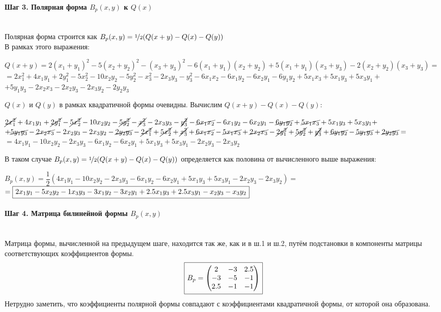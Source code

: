 \documentclass{article}
\newcommand*\squared[1]{\tikz[baseline=(char.base)]{
            \node[shape=rectangle,draw,inner sep=4pt] (char) {#1};}}
\begin{document}
\paragraph*{Шаг 3. Полярная форма $B_p(x,y)$ к $Q(x)$} \, \\
Полярная форма строится как $B_p(x,y) = \nicefrac{1}{2}(Q(x+y) - Q(x)-Q(y))$ \\
В рамках этого выражения:
\begin{center}
$Q(x+y) = 2(x_1 + y_1)^2 - 5(x_2 + y_2)^2 - (x_3 + y_3)^2 - 6(x_1 + y_1)(x_2 + y_2) + 5(x_1 + y_1)(x_3 + y_3) - 2(x_2 + y_2)(x_3 + y_3) =$ \\
$= 2x_1^2 + 4x_1y_1 + 2y_1^2 - 5x_2^2 - 10x_2y_2 - 5y_2^2 - x_3^2 - 2x_3y_3 - y_3^2 - 6x_1x_2 - 6x_1y_2 - 6x_2y_1 - 6y_1y_2 + 5x_1x_3 + 5x_1y_3 + 5x_3y_1 +$ \\ $+ 5y_1y_3 - 2x_2x_3 - 2x_2y_3 - 2x_3y_2 - 2y_2y_3$
\end{center}
$Q(x)$ и $Q(y)$ в рамках квадратичной формы очевидны. Вычислим $Q(x+y) - Q(x) - Q(y)$:
\begin{center}
$\cancel{2x_1^2} + 4x_1y_1 + \cancel{2y_1^2} - \cancel{5x_2^2} - 10x_2y_2 - \cancel{5y_2^2} - \cancel{x_3^2} - 2x_3y_3 - \cancel{y_3^2} - \cancel{6x_1x_2} - 6x_1y_2 - 6x_2y_1 - \cancel{6y_1y_2} + \cancel{5x_1x_3} + 5x_1y_3 + 5x_3y_1 +$\\
$+ \cancel{5y_1y_3} - \cancel{2x_2x_3} - 2x_2y_3 - 2x_3y_2 - \cancel{2y_2y_3} - \cancel{2x_1^2} + \cancel{5x_2^2} + \cancel{x_3^2} + \cancel{6x_1x_2} - \cancel{5x_1x_3} + \cancel{2x_2x_3} - \cancel{2y_1^2} + \cancel{5y_2^2} + \cancel{y_3^2} + \cancel{6y_1y_2} - \cancel{5y_1y_3} + \cancel{2y_2y_3} =$ \\
$= 4x_1y_1 - 10x_2y_2 - 2x_3y_3 - 6x_1y_2 - 6x_2y_1 + 5x_1y_3 + 5x_3y_1 - 2x_2y_3 - 2x_3y_2$
\end{center}
В таком случае $B_p(x, y) = \nicefrac{1}{2}(Q(x+y) - Q(x)-Q(y))$ определяется как половина от вычисленного выше выражения:
\begin{center}
$B_p(x, y) = \dfrac{1}{2}\left(4x_1y_1 - 10x_2y_2 - 2x_3y_3 - 6x_1y_2 - 6x_2y_1 + 5x_1y_3 + 5x_3y_1 - 2x_2y_3 - 2x_3y_2\right) =$ \\
$= \squared{$2x_1y_1 - 5x_2y_2 - 1x_3y_3 - 3x_1y_2 - 3x_2y_1 + 2.5x_1y_3 + 2.5x_3y_1 - x_2y_3 - x_3y_2$}$
\end{center}
\paragraph*{Шаг 4. Матрица билинейной формы $B_p(x, y)$} \, \\
Матрица формы, вычисленной на предыдущем шаге, находится так же, как и в ш.1 и ш.2, путём подстановки в компоненты матрицы соответствующих коэффициентов формы.
$$\squared{$B_p = \begin{pmatrix}
2 & -3 & 2.5 \\
-3 & -5 & -1 \\
2.5 & -1 & -1
\end{pmatrix}$}$$
Нетрудно заметить, что коэффициенты полярной формы совпадают с коэффициентами квадратичной формы, от которой она образована.
\end{document}
